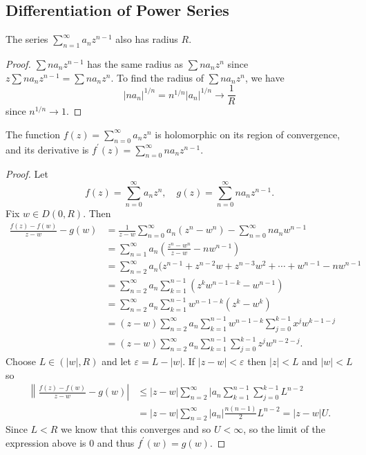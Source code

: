 \subsection{Differentiation of Power Series}

\begin{lemma}
  The series $\sum_{n=1}^\infty a_n z^{n-1}$ also has radius $R$.
\end{lemma}
\begin{proof}
  $\sum n a_n z^{n-1}$ has the same radius as $\sum n a_n z^n$ since
  $z \sum n a_n z^{n-1} = \sum n a_n z^n$. To find the radius of
  $\sum n a_n z^n$, we have
  $$
  |n a_n|^{1 / n} = n^{1 / n} |a_n|^{1 / n} \to \frac{1}{R}
  $$
  since $n^{1 / n} \to 1$.
\end{proof}

\begin{theorem}
  The function $f(z) = \sum_{n=0}^\infty a_n z^n$ is
  holomorphic on its region of convergence, and its derivative
  is $f^\prime(z) = \sum_{n=0}^\infty n a_n z^{n-1}$.
\end{theorem}

\begin{proof}
  Let
  $$
  f(z) = \sum_{n=0}^\infty a_n z^n, \quad
  g(z) = \sum_{n=0}^\infty n a_n z^{n-1}.
  $$
  Fix $w \in D(0, R)$. Then
  \begin{align*}
     \frac{f(z) - f(w)}{z - w} - g(w)
   &= \frac{1}{z - w} \sum_{n=0}^\infty a_n (z^n - w^n)
    - \sum_{n=0}^\infty n a_n w^{n-1} \\
   &= \sum_{n=1}^\infty a_n \left(\frac{z^n - w^n}{z - w} - nw^{n-1}\right) \\
   &= \sum_{n=2}^\infty a_n
        ( z^{n-1} + z^{n-2} w + z^{n-3} w^2 + \cdots + w^{n-1} - n w^{n-1} \\
   &= \sum_{n=2}^\infty a_n \sum_{k=1}^{n-1} (z^k w^{n-1-k} - w^{n-1}) \\
   &= \sum_{n=2}^\infty a_n \sum_{k=1}^{n-1} w^{n-1-k}(z^k - w^k) \\
   &= (z - w) \sum_{n=2}^\infty a_n
                \sum_{k=1}^{n-1} w^{n-1-k}
                  \sum_{j=0}^{k-1} x^j w^{k-1-j} \\
   &= (z - w) \sum_{n=2}^\infty a_n
                \sum_{k=1}^{n-1}
                  \sum_{j=0}^{k-1} z^j w^{n - 2 - j}.
  \end{align*}
  Choose $L \in (|w|, R)$ and let $\varepsilon = L - |w|$.
  If $|z - w| < \varepsilon$ then $|z| < L$ and $|w| < L$ so
  \begin{align*}
        \left\| \frac{f(z) - f(w)}{z - w} - g(w) \right|
  &\leq |z - w| \sum_{n=2}^\infty |a_n \sum_{k=1}^{n-1} \sum_{j=0}^{k-1} L^{n-2} \\
  &=    |z - w| \sum_{n=2}^\infty |a_n| \frac{n(n-1)}{2} L^{n-2}
   =    |z - w| U.
  \end{align*}
  Since $L < R$ we know that this converges and so $U < \infty$, so
  the limit of the expression above is 0 and thus $f^\prime(w) = g(w)$.
\end{proof}

